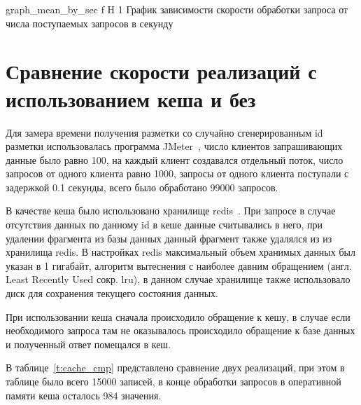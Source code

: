 {graph_mean_by_sec} %
{f} %
{H} %
{1\textwidth} %
{График зависимости скорости обработки запроса от числа поступаемых запросов в секунду} %


\section{Сравнение скорости реализаций с использованием кеша и без}

Для замера времени получения разметки со случайно сгенерированным id разметки использовалась программа JMeter~\cite{JMeter}, число клиентов запрашивающих данные было равно 100, на каждый клиент создавался отдельный поток, число запросов от одного клиента равно 1000, запросы от одного клиента поступали с задержкой 0.1 секунды, всего было обработано 99000 запросов.


В качестве кеша было использовано хранилище redis~\cite{redis}. При запросе в случае отсутствия данных по данному id в кеше данные считывались в него, при удалении фрагмента из базы данных данный фрагмент также удалялся из из хранилища redis. В настройках redis максимальный объем хранимых данных был указан в 1 гигабайт, алгоритм вытеснения с наиболее давним обращением (англ. Least Recently Used сокр. lru), в данном случае хранилище также использовало диск для сохранения текущего состояния данных.

При использовании кеша сначала происходило обращение к кешу, в случае если необходимого запроса там не оказывалось происходило обращение к базе данных и полученный ответ помещался в кеш.

В таблице~\ref{t:cache_cmp}	 представлено сравнение двух реализаций, при этом в таблице было всего 15000 записей, в конце обработки запросов в оперативной памяти кеша осталось 984 значения.

